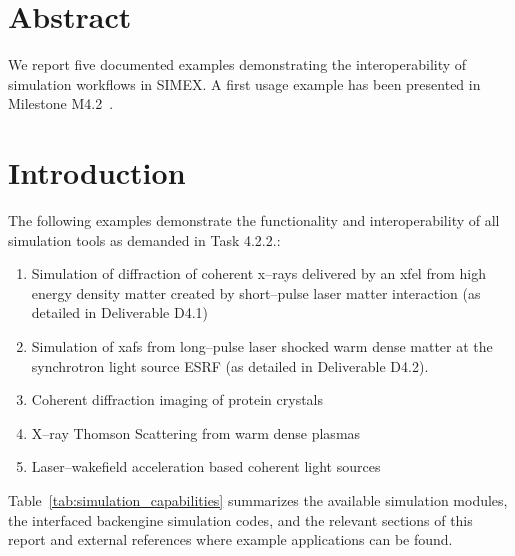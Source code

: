 \documentclass[10pt]{scrartcl}
\begin{document}
\section*{Abstract}\label{sec:summary}
 We report five documented examples demonstrating the interoperability of
 simulation workflows in SIMEX. A first usage example has been presented in
Milestone M4.2~\cite{EUCALL_SIMEX_M4.2}.

\section{Introduction}
The following examples demonstrate the functionality and interoperability of all
simulation tools as demanded in Task 4.2.2.:
\begin{enumerate}
  \item Simulation of diffraction of coherent x--rays delivered by an
    \gls{xfel}
    from high energy density matter created by short--pulse
    laser matter interaction (as detailed in Deliverable D4.1)
  \item Simulation of \gls{xafs} from long--pulse laser
    shocked warm dense matter at the synchrotron light source ESRF (as detailed
    in Deliverable D4.2).
  \item Coherent diffraction imaging of protein crystals
  \item X--ray Thomson Scattering from warm dense plasmas
  \item Laser--wakefield acceleration based coherent light sources
\end{enumerate}
%

Table~\ref{tab:simulation_capabilities} summarizes the available simulation
modules, the interfaced backengine simulation codes, and the relevant sections
of this report and external references where example applications can be found.
\end{document}
